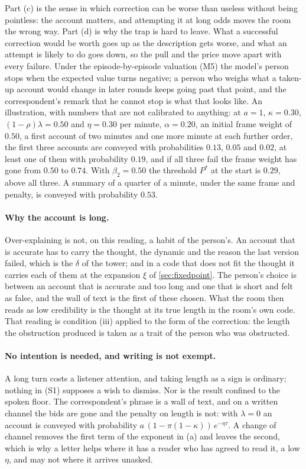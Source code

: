 Part (c) is the sense in which correction can be worse than useless without being pointless: the account matters, and attempting it at long odds moves the room the wrong way. Part (d) is why the trap is hard to leave. What a successful correction would be worth goes up as the description gets worse, and what an attempt is likely to do goes down, so the pull and the price move apart with every failure. Under the episode-by-episode valuation (M5) the model's person stops when the expected value turns negative; a person who weighs what a taken-up account would change in later rounds keeps going past that point, and the correspondent's remark that he cannot stop is what that looks like. An illustration, with numbers that are not calibrated to anything: at $a = 1$, $\kappa = 0.30$, $(1-\rho)\lambda = 0.50$ and $\eta = 0.30$ per minute, $\alpha = 0.20$, an initial frame weight of $0.50$, a first account of two minutes and one more minute at each further order, the first three accounts are conveyed with probabilities $0.13$, $0.05$ and $0.02$, at least one of them with probability $0.19$, and if all three fail the frame weight has gone from $0.50$ to $0.74$. With $\beta_2 = 0.50$ the threshold $P^{\ast}$ at the start is $0.29$, above all three. A summary of a quarter of a minute, under the same frame and penalty, is conveyed with probability $0.53$.

\paragraph{Why the account is long.} Over-explaining is not, on this reading, a habit of the person's. An account that is accurate has to carry the thought, the dynamic and the reason the last version failed, which is the $\delta$ of the tower; and in a code that does not fit the thought it carries each of them at the expansion $\xi$ of \autoref{sec:fixedpoint}. The person's choice is between an account that is accurate and too long and one that is short and felt as false, and the wall of text is the first of these chosen. What the room then reads as low credibility is the thought at its true length in the room's own code. That reading is condition (iii) applied to the form of the correction: the length the obstruction produced is taken as a trait of the person who was obstructed.

\paragraph{No intention is needed, and writing is not exempt.} A long turn costs a listener attention, and taking length as a sign is ordinary; nothing in (S1) supposes a wish to dismiss. Nor is the result confined to the spoken floor. The correspondent's phrase is a wall of text, and on a written channel the bids are gone and the penalty on length is not: with $\lambda = 0$ an account is conveyed with probability $a\,(1 - \pi(1-\kappa))\,e^{-\eta\tau}$. A change of channel removes the first term of the exponent in (a) and leaves the second, which is why a letter helps where it has a reader who has agreed to read it, a low $\eta$, and may not where it arrives unasked.

